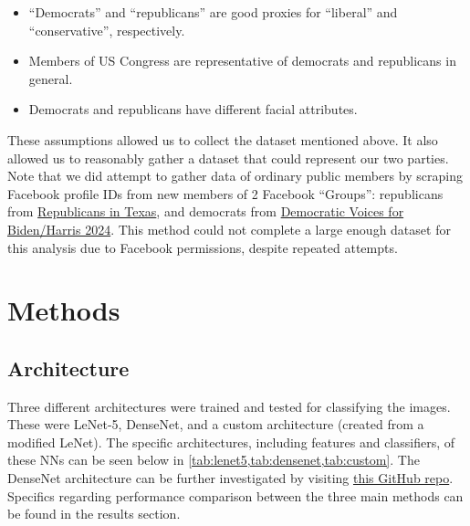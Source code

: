 \documentclass[manuscript,screen,review]{acmart}
\begin{document}
\begin{itemize}
\item ``Democrats'' and ``republicans'' are good proxies for ``liberal'' and ``conservative'', respectively. 
\item Members of US Congress are representative of democrats and republicans in general. 
\item Democrats and republicans have different facial attributes. 
\end{itemize}

These assumptions allowed us to collect the dataset mentioned above. It also allowed us to reasonably gather a dataset that could represent our two parties. Note that we did attempt to gather data of ordinary public members by scraping Facebook profile IDs from new members of 2 Facebook ``Groups'': republicans from \href{https://www.facebook.com/groups/RU4TX/}{Republicans in Texas}, and democrats from \href{https://www.facebook.com/groups/111188856119651/}{Democratic Voices for Biden/Harris 2024}. This method could not complete a large enough dataset for this analysis due to Facebook permissions, despite repeated attempts.

\section{Methods}

\subsection{Architecture}

Three different architectures were trained and tested for classifying the images. These were LeNet-5, DenseNet, and a custom architecture (created from a modified LeNet). The specific architectures, including features and classifiers, of these NNs can be seen below in \cref{tab:lenet5,tab:densenet,tab:custom}. The DenseNet architecture can be further investigated by visiting \href{https://github.com/andreasveit/densenet-pytorch}{this GitHub repo}. Specifics regarding performance comparison between the three main methods can be found in the results section.
\end{document}
